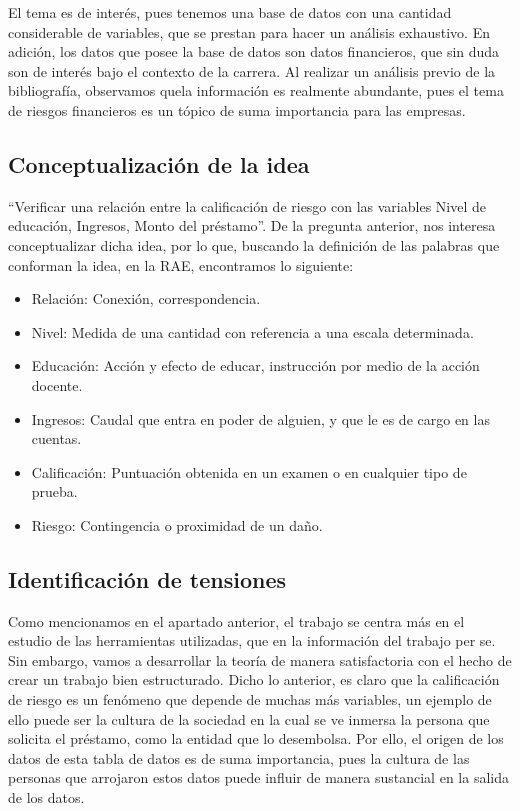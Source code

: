\documentclass[
  letterpaper,
  DIV=11,
  numbers=noendperiod]{scrreprt}
\begin{document}
El tema es de interés, pues tenemos una base de datos con una cantidad
considerable de variables, que se prestan para hacer un análisis
exhaustivo. En adición, los datos que posee la base de datos son datos
financieros, que sin duda son de interés bajo el contexto de la carrera.
Al realizar un análisis previo de la bibliografía, observamos quela
información es realmente abundante, pues el tema de riesgos financieros
es un tópico de suma importancia para las empresas.

\subsection{Conceptualización de la
idea}\label{conceptualizaciuxf3n-de-la-idea}

``Verificar una relación entre la calificación de riesgo con las
variables Nivel de educación, Ingresos, Monto del préstamo''. De la
pregunta anterior, nos interesa conceptualizar dicha idea, por lo que,
buscando la definición de las palabras que conforman la idea, en la RAE,
encontramos lo siguiente:

\begin{itemize}
\item
  Relación: Conexión, correspondencia.
\item
  Nivel: Medida de una cantidad con referencia a una escala determinada.
\item
  Educación: Acción y efecto de educar, instrucción por medio de la
  acción docente.
\item
  Ingresos: Caudal que entra en poder de alguien, y que le es de cargo
  en las cuentas.
\item
  Calificación: Puntuación obtenida en un examen o en cualquier tipo de
  prueba.
\item
  Riesgo: Contingencia o proximidad de un daño.
\end{itemize}

\subsection{Identificación de
tensiones}\label{identificaciuxf3n-de-tensiones}

Como mencionamos en el apartado anterior, el trabajo se centra más en el
estudio de las herramientas utilizadas, que en la información del
trabajo per se. Sin embargo, vamos a desarrollar la teoría de manera
satisfactoria con el hecho de crear un trabajo bien estructurado. Dicho
lo anterior, es claro que la calificación de riesgo es un fenómeno que
depende de muchas más variables, un ejemplo de ello puede ser la cultura
de la sociedad en la cual se ve inmersa la persona que solicita el
préstamo, como la entidad que lo desembolsa. Por ello, el origen de los
datos de esta tabla de datos es de suma importancia, pues la cultura de
las personas que arrojaron estos datos puede influir de manera
sustancial en la salida de los datos.
\end{document}
